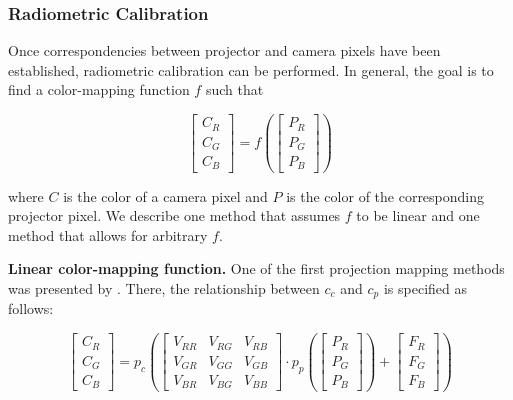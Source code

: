 \subsubsection{Radiometric Calibration}
\label{section:background-projection_mapping-procams-radiometric_calibration}

Once correspondencies between projector and camera pixels have been established, radiometric calibration can be performed. In general, the goal is to find a color-mapping function \(f\) such that

\begin{equation}
    \label{eq:radiometric_calibration}
    \begin{bmatrix}
        C_R \\
        C_G \\
        C_B
    \end{bmatrix} = f(
        \begin{bmatrix}
            P_R \\
            P_G \\
            P_B
        \end{bmatrix}
    )
\end{equation}

where \(C\) is the color of a camera pixel and \(P\) is the color of the corresponding projector pixel. We describe one method that assumes \(f\) to be linear and one method that allows for arbitrary \(f\).

\textbf{Linear color-mapping function.} One of the first projection mapping methods was presented by \citet{Grossberg2004}. There, the relationship between \(c_c\) and \(c_p\) is specified as follows:

\begin{equation}
    \label{eq:linear_color_mapping}
    \begin{bmatrix}
        C_R \\
        C_G \\
        C_B
    \end{bmatrix} = p_c(
        \begin{bmatrix}
            V_{RR} & V_{RG} & V_{RB} \\
            V_{GR} & V_{GG} & V_{GB} \\
            V_{BR} & V_{BG} & V_{BB}
        \end{bmatrix} \cdot p_p(
            \begin{bmatrix}
                P_R \\
                P_G \\
                P_B
            \end{bmatrix}
        ) +
        \begin{bmatrix}
            F_R \\
            F_G \\
            F_B
        \end{bmatrix}
    )
\end{equation}

